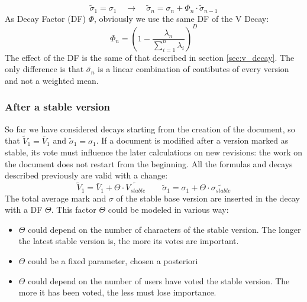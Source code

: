 \documentclass[a4paper,11pt]{article}
\newcommand{\sg}{$\sigma$ }
\begin{document}
\begin{equation} \label{eq:s_hat}
\tilde{\sigma}_1 = \sigma_1  \quad\longrightarrow\quad \tilde{\sigma}_n = \sigma_n + \Phi_n \cdot \tilde{\sigma}_{n-1}
\end{equation}
As Decay Factor (DF) $\Phi$, obviously we use the same DF of the V Decay:
\begin{equation}
\Phi_n = \left(1 - \frac{\lambda_n}{\sum_{i=1}^n \lambda_i}\right)^D
\end{equation}
The effect of the DF is the same of that described in section \ref{sec:v_decay}. The only difference is that $\tilde{\sigma_n}$ is a linear combination of contibutes of every version and not a weighted mean. 

\subsubsection{After a stable version}\label{sec:after_stable}
So far we have considered decays starting from the creation of the document, so that $\tilde{V}_1 = \bar{V}_1$ and $\tilde{\sigma}_1 = \sigma_1$. 
If a document is modified after a version marked as stable, its vote must influence the later calculations on new revisions: the work on the document does not restart from the beginning.
All the formulas and decays described previously are valid with a change:
\begin{equation}
\tilde{V}_1 = \bar{V}_1 + \Theta \cdot \tilde{V_{stable}} \qquad \tilde{\sigma}_1 = \sigma_1 + \Theta \cdot \tilde{\sigma_{stable}}
\end{equation}
The total average mark and \sg of the stable base version are inserted in the decay with a DF $\Theta$. This factor $\Theta$ could be modeled in various way: 
\begin{itemize}
\item $\Theta$ could depend on the number of characters of the stable version. The longer the latest stable version is, the more its votes are important.
\item $\Theta$ could be a fixed parameter, chosen a posteriori
\item $\Theta$ could depend on the number of users have voted the stable version. The more it has been voted, the less must lose importance.
\end{itemize}
\end{document}
